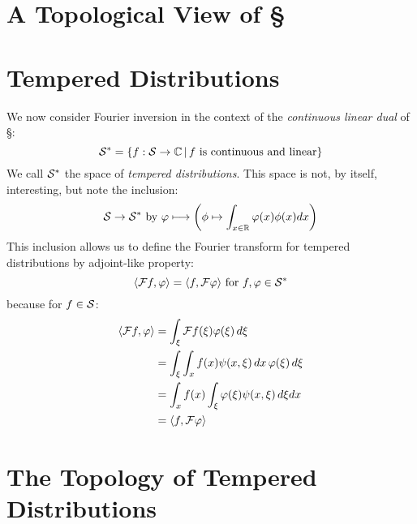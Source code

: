     \section{A Topological View of \S}

    \section{Tempered Distributions}
      We now consider Fourier inversion in the context of the \emph{continuous linear dual} of \S:
      \begin{equation*}
        \S^* = \{f:\S\rightarrow\C\,\vert\,f\text{ is continuous and linear}\}
      \end{equation*}
      We call $\S^*$ the space of \emph{tempered distributions}.
      This space is not, by itself, interesting, but note the inclusion:
      \begin{equation*}
        \S\rightarrow\S^*\text{ by }\varphi \longmapsto\left(\phi\mapsto\int_{x\in\R}\varphi(x)\phi(x)dx\right)
      \end{equation*}
      This inclusion allows us to define the Fourier transform for tempered distributions by adjoint-like property:
      \begin{equation*}
        \langle\F f,\varphi\rangle = \langle f,\F\varphi\rangle \text{ for }f,\varphi\in\S^*
      \end{equation*}
      because for $f\in\S$:
      \begin{align*}
        \langle\F f,\varphi\rangle &= \int_\xi\F f(\xi)\varphi(\xi)\,d\xi\\
        &= \int_\xi\int_xf(x)\psi(x,\xi)\,dx\,\varphi(\xi)\,d\xi\\
        &= \int_xf(x)\int_\xi\varphi(\xi)\psi(x,\xi)\,d\xi dx\\
        &= \langle f,\F\varphi\rangle
      \end{align*}

    \section{The Topology of Tempered Distributions}


